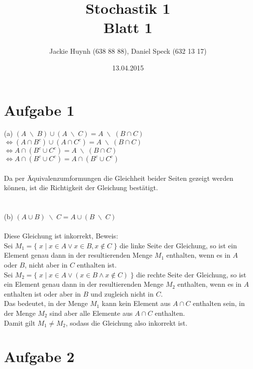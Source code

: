 \documentclass[10pt,a4paper]{article}
\title{\textbf{\huge Stochastik 1
\\\large Blatt 1}}
\author{Jackie Huynh (638 88 88), Daniel Speck (632 13 17)}
\date{13.04.2015}
\newcommand{\bs}{\;\backslash\;}
\begin{document}
	\maketitle


	\section*{Aufgabe 1}
	
		(a) \quad
		$(A \bs B) \cup (A \bs C) = A \bs (B \cap C)$
		\\
		$\Leftrightarrow (A \cap B^c) \cup (A \cap C^c) = A \bs (B \cap C)$
		\\
		$\Leftrightarrow A \cap (B^c \cup C^c) = A \bs (B \cap C)$
		\\
		$\Leftrightarrow A \cap (B^c \cup C^c) = A \cap (B^c \cup C^c)$
		\\
		\\
		Da per Äquivalenzumformungen die Gleichheit beider Seiten gezeigt werden können, ist die Richtigkeit der Gleichung bestätigt.
		\\
		\\
		\\
		(b) \quad
		$(A \cup B) \bs C = A \cup (B \bs C)$
		\\
		\\
		Diese Gleichung ist inkorrekt, Beweis:
		\\
		Sei $M_1 = \{\; x \;|\; x \in A \lor x \in B, x \not\in C \;\}$ die linke Seite der Gleichung, so ist ein Element genau dann in der resultierenden Menge $M_1$ enthalten, wenn es in $A$ oder $B$, nicht aber in $C$ enthalten ist.
		\\
		Sei $M_2 = \{\; x \;|\; x \in A \lor (x \in B \land x \not\in C) \;\}$ die rechte Seite der Gleichung, so ist ein Element genau dann in der resultierenden Menge $M_2$ enthalten, wenn es in $A$ enthalten ist oder aber in $B$ und zugleich nicht in $C$.
		\\
		Das bedeutet, in der Menge $M_1$ kann kein Element aus $A \cap C$ enthalten sein, in der Menge $M_2$ sind aber alle Elemente aus $A \cap C$ enthalten.
		\\
		Damit gilt $M_1 \neq M_2$, sodass die Gleichung also inkorrekt ist.
		
		\begin{flushright}
			\text{$\Box$}
		\end{flushright}


	\section*{Aufgabe 2}
\end{document}
